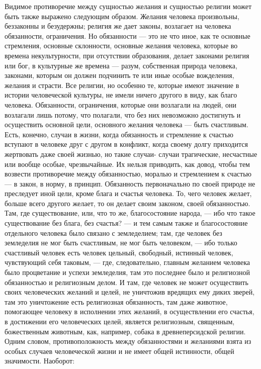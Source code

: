 \documentclass[12pt]{article}
\begin{document}
Видимое противоречие между сущностью желания и сущностью религии может быть также выражено следующим образом. Желания человека произвольны, беззаконны и безудержны; религия же дает законы, возлагает на человека обязанности, ограничения. Но обязанности --- это не что иное, как те основные стремления, основные склонности, основные желания человека, которые во времена некультурности, при отсутствии образования, делает законами религия или бог, в культурные же времена --- разум, собственная природа человека, законами, которым он должен подчинить те или иные особые вожделения, желания и страсти. Все религии, но особенно те, которые имеют значение в истории человеческой культуры, не имели ничего другого в виду, как благо человека. Обязанности, ограничения, которые они возлагали на людей, они возлагали лишь потому, что полагали, что без них невозможно достигнуть и осуществить основной цели, основного желания человека --- быть счастливым. Есть, конечно, случаи в жизни, когда обязанность и стремление к счастью вступают в человеке друг с другом в конфликт, когда своему долгу приходится жертвовать даже своей жизнью, но такие случаи- случаи трагические, несчастные или вообще особые, чрезвычайные. Их нельзя приводить, как довод, чтобы тем возвести противоречие между обязанностью, моралью и стремлением к счастью --- в закон, в норму, в принцип. Обязанность первоначально по своей природе не преследует иной цели, кроме блага и счастья человека. То, чего человек желает, больше всего другого желает, то он делает своим законом, своей обязанностью. Там, где существование, или, что то же, благосостояние народа, --- ибо что такое существование без блага, без счастья? --- и тем самым также и благосостояние отдельного человека было связано с земледелием; там, где человек без земледелия не мог быть счастливым, не мог быть человеком, --- ибо только счастливый человек есть человек цельный, свободный, истинный человек, чувствующий себя таковым, --- где, следовательно, главным желанием человека было процветание и успехи земледелия, там это последнее было и религиозной обязанностью и религиозным делом. И там, где человек не может осуществить своих человеческих желаний и целей, не уничтожив вредящих ему диких зверей, там это уничтожение есть религиозная обязанность, там даже животное, помогающее человеку в исполнении этих желаний, в осуществлении его счастья, в достижении его человеческих целей, является религиозным, священным, божественным животным, как, например, собака в древнеперсидской религии. Одним словом, противоположность между обязанностями и желаниями взята из особых случаев человеческой жизни и не имеет общей истинности, общей значимости. Наоборот: 
\end{document}

